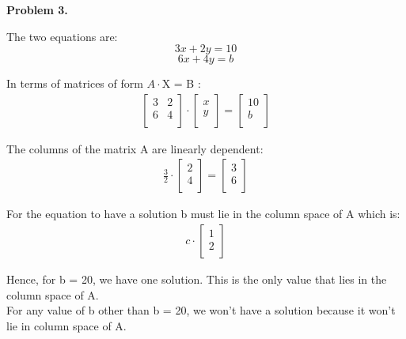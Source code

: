 \documentclass[a4paper]{article}
\begin{document}
\hfill \newline
\textbf{Problem 3.}\\ \newline

The two equations are:
\begin{equation}
3x + 2y = 10
\end{equation}
\begin{equation}
6x + 4y = b
\end{equation}

In terms of matrices of form $A \cdot $X = B : 
\begin{align}  
\begin{bmatrix}
   3 & 2\\
   6 & 4 \\
 \end{bmatrix}
\cdot
\begin{bmatrix}
  x \\
  y\\ 
 \end{bmatrix}
=
\begin{bmatrix}
 10\\
 b\\
\end{bmatrix}
\end{align}

The columns of the matrix A are linearly dependent: 
\begin{align}
\frac{3}{2}
\cdot
\begin{bmatrix}
  2\\
  4\\ 
 \end{bmatrix}
 = 
 \begin{bmatrix}
  3\\
  6\\ 
 \end{bmatrix}
\end{align}

For the equation to have a solution b must lie in the column space of A which is:
\begin{align}
c
\cdot
\begin{bmatrix}
  1\\
  2\\ 
 \end{bmatrix}
\end{align}

Hence, for b = 20, we have one solution. This is the only value that lies in the column space of A.\\
For any value of b other than b = 20, we won't have a solution because it won't lie in column space of A.\\
\end{document}
